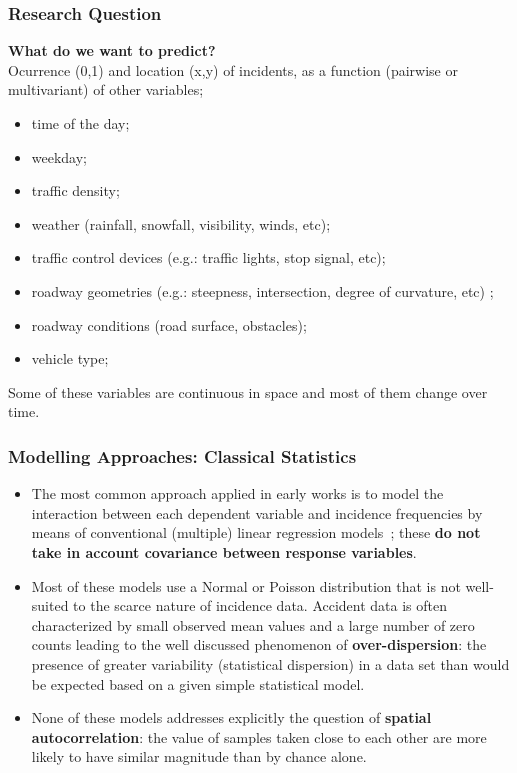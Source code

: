 \documentclass[hyperref={pdfpagelabels=true}]{beamer}
\begin{document}
\begin{frame}
\frametitle{Research Question}
\textbf{ What do we want to predict?}\\
Ocurrence (0,1) and location (x,y) of incidents, as a function (pairwise or multivariant) of other variables;
\small{
\begin{itemize}
\item time of the day;
\item weekday;
\item traffic density;
\item weather (rainfall, snowfall, visibility, winds, etc);
\item traffic control devices (e.g.: traffic lights, stop signal, etc);
\item roadway geometries (e.g.: steepness, intersection, degree of curvature, etc) 
;
\item roadway conditions (road surface, obstacles);
\item vehicle type;
\end{itemize}
}
Some of these variables are continuous in space and most of them change over time.\\
\end{frame}

\begin{frame}
\frametitle{Modelling Approaches: Classical Statistics}
\begin{itemize}
\item<1-> The most common approach applied in early works is to model the interaction between each dependent variable and incidence frequencies by means of conventional (multiple) linear regression models~\cite{bayesian}; these \textbf{do not take in account covariance between response variables}. 
\item<2-> Most of these models use a Normal or Poisson distribution that is not well-suited to the scarce nature of incidence data. Accident data is often characterized by small observed mean values and a large number of zero counts leading to the well discussed phenomenon of \textbf{over-dispersion}: the presence of greater variability (statistical dispersion) in a data set than would be expected based on a given simple statistical model.
\item<3-> None of these models addresses explicitly the question of \textbf{spatial autocorrelation}: the value of samples taken close to each other are more likely to have similar magnitude than by chance alone.
\end{itemize}
\end{frame}
\end{document}
